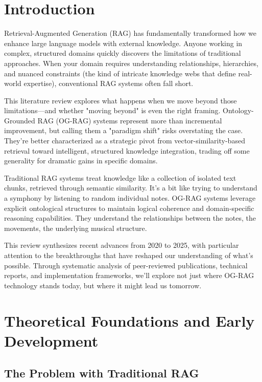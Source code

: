 \label{chap:litreview}

\section{Introduction}

Retrieval-Augmented Generation (RAG) has fundamentally transformed how we enhance large language models with external knowledge. Anyone working in complex, structured domains quickly discovers the limitations of traditional approaches. When your domain requires understanding relationships, hierarchies, and nuanced constraints (the kind of intricate knowledge webs that define real-world expertise), conventional RAG systems often fall short.

This literature review explores what happens when we move beyond those limitations—and whether "moving beyond" is even the right framing. Ontology-Grounded RAG (OG-RAG) systems represent more than incremental improvement, but calling them a "paradigm shift" risks overstating the case. They're better characterized as a strategic pivot from vector-similarity-based retrieval toward intelligent, structured knowledge integration, trading off some generality for dramatic gains in specific domains.

Traditional RAG systems treat knowledge like a collection of isolated text chunks, retrieved through semantic similarity. It's a bit like trying to understand a symphony by listening to random individual notes. OG-RAG systems leverage explicit ontological structures to maintain logical coherence and domain-specific reasoning capabilities. They understand the relationships between the notes, the movements, the underlying musical structure.

This review synthesizes recent advances from 2020 to 2025, with particular attention to the breakthroughs that have reshaped our understanding of what's possible. Through systematic analysis of peer-reviewed publications, technical reports, and implementation frameworks, we'll explore not just where OG-RAG technology stands today, but where it might lead us tomorrow.

\section{Theoretical Foundations and Early Development}

\subsection{The Problem with Traditional RAG}


